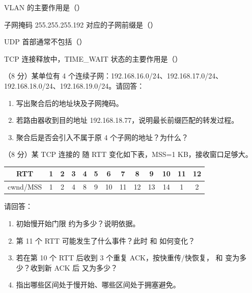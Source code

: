 \documentclass[a4paper,11pt]{article}
\begin{document}
\q VLAN 的主要作用是（\quad）

\q 子网掩码 255.255.255.192 对应的子网前缀是（\quad）

\q UDP 首部通常不包括（\quad）

\q TCP 连接释放中，TIME_WAIT 状态的主要作用是（\quad）


\q （8 分）某单位有 4 个连续子网：192.168.16.0/24、192.168.17.0/24、192.168.18.0/24、192.168.19.0/24。请回答：
\begin{enumerate}[label=（\arabic*）, leftmargin=2.4em, itemsep=1pt]
  \item 写出聚合后的地址块及子网掩码。
  \item 若路由器收到目的地址 192.168.18.77，说明最长前缀匹配的转发过程。
  \item 聚合后是否会引入不属于原 4 个子网的地址？为什么？
\end{enumerate}
\anslines{6.5cm}

\q （8 分）某 TCP 连接的  随 RTT 变化如下表，MSS=1 KB，接收窗口足够大。
\begin{center}\small
\begin{tabular}{c|cccccccccccc}
\toprule
RTT & 1&2&3&4&5&6&7&8&9&10&11&12\\
\midrule
cwnd/MSS & 1&2&4&8&9&10&11&12&13&14&1&2\\
\bottomrule
\end{tabular}
\end{center}
请回答：
\begin{enumerate}[label=（\arabic*）, leftmargin=2.4em, itemsep=1pt]
  \item 初始慢开始门限  约为多少？说明依据。
  \item 第 11 个 RTT 可能发生了什么事件？此时  和  如何变化？
  \item 若在第 10 个 RTT 后收到 3 个重复 ACK，按快重传/快恢复， 和  变为多少？收到新 ACK 后  又为多少？
  \item 指出哪些区间处于慢开始、哪些区间处于拥塞避免。
\end{enumerate}
\anslines{7cm}
\end{document}
